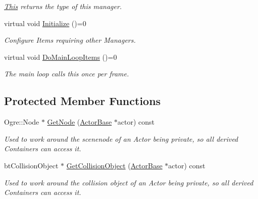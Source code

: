 \begin{DoxyCompactItemize}
\begin{DoxyCompactList}\small\item\em \hyperlink{structThis}{This} returns the type of this manager. \item\end{DoxyCompactList}\item 
virtual void \hyperlink{classphys_1_1ActorContainerBase_af36d5866e0ee9f6f450a4e62642e0928}{Initialize} ()=0
\begin{DoxyCompactList}\small\item\em Configure Items requiring other Managers. \item\end{DoxyCompactList}\item 
virtual void \hyperlink{classphys_1_1ActorContainerBase_a67fbde6a61602253f66fecd0416bdc2f}{DoMainLoopItems} ()=0
\begin{DoxyCompactList}\small\item\em The main loop calls this once per frame. \item\end{DoxyCompactList}\end{DoxyCompactItemize}
\subsection*{Protected Member Functions}
\begin{DoxyCompactItemize}
\item 
Ogre::Node $\ast$ \hyperlink{classphys_1_1ActorContainerBase_a9813fe23051cc1a324bfedd4d35d27ad}{GetNode} (\hyperlink{classphys_1_1ActorBase}{ActorBase} $\ast$actor) const 
\begin{DoxyCompactList}\small\item\em Used to work around the scenenode of an Actor being private, so all derived Containers can access it. \item\end{DoxyCompactList}\item 
btCollisionObject $\ast$ \hyperlink{classphys_1_1ActorContainerBase_a3f3d84f7775d2e8597290e214fedd5f9}{GetCollisionObject} (\hyperlink{classphys_1_1ActorBase}{ActorBase} $\ast$actor) const 
\begin{DoxyCompactList}\small\item\em Used to work around the collision object of an Actor being private, so all derived Containers can access it. \item\end{DoxyCompactList}\end{DoxyCompactItemize}


